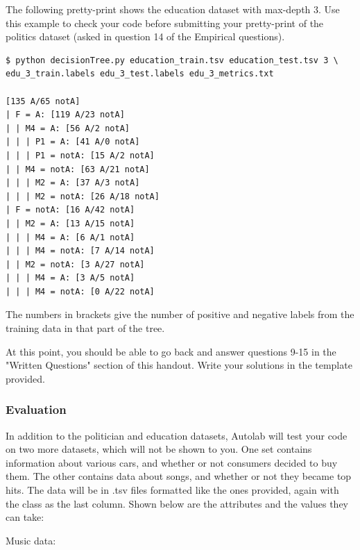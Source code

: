 \documentclass[11pt]{article}
\numberwithin{equation}{section} %
\numberwithin{figure}{section} %
\numberwithin{table}{section} %
\begin{document}
The following pretty-print shows the education dataset with max-depth 3.  Use this example to check your code before submitting your pretty-print of the politics dataset (asked in question 14 of the Empirical questions).  

\begin{lstlisting}[language=Shell]
$ python decisionTree.py education_train.tsv education_test.tsv 3 \
edu_3_train.labels edu_3_test.labels edu_3_metrics.txt

[135 A/65 notA]
| F = A: [119 A/23 notA]
| | M4 = A: [56 A/2 notA]
| | | P1 = A: [41 A/0 notA]
| | | P1 = notA: [15 A/2 notA]
| | M4 = notA: [63 A/21 notA]
| | | M2 = A: [37 A/3 notA]
| | | M2 = notA: [26 A/18 notA]
| F = notA: [16 A/42 notA]
| | M2 = A: [13 A/15 notA]
| | | M4 = A: [6 A/1 notA]
| | | M4 = notA: [7 A/14 notA]
| | M2 = notA: [3 A/27 notA]
| | | M4 = A: [3 A/5 notA]
| | | M4 = notA: [0 A/22 notA]
\end{lstlisting}

The numbers in brackets give the number of positive and negative labels from the training data in that part of the tree.

\begin{notebox}
At this point, you should be able to go back and answer questions 9-15 in the "Written Questions" section of this handout.  Write your solutions in the template provided. 
\end{notebox}

\subsubsection{Evaluation}
In addition to the politician and education datasets, Autolab will test your code on two more datasets, which will not be shown to you. One set contains information about various cars, and whether or not consumers decided to buy them. The other contains data about songs, and whether or not they became top hits. The data will be in .tsv files formatted like the ones provided, again with the class as the last column. Shown below are the attributes and the values they can take: 

Music data:
\end{document}
